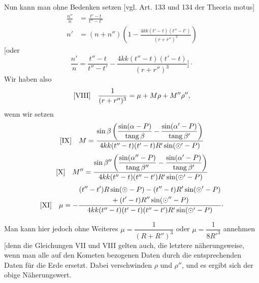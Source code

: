 Nun kann man ohne Bedenken setzen [vgl. Art. 133 und 134 der Theoria motus]
\[
\begin{aligned}
\frac{n''}{n}&=\frac{t'-t}{t''-t'}\\
n'&=(n+n'')\left(1-\frac{4kk(t'-t)(t''-t')}{(r+r'')^3}\right)
\end{aligned}
\]
[oder
\[
\frac{n'}{n}=\frac{t''-t}{t''-t'}-\frac{4kk(t''-t)(t'-t)}{(r+r'')^3}\Biggr]\mathpunct{\cdot}
\]
Wir haben also
\[
\begin{array}{l@{\quad}l}
[\mathrm{VIII}]&\displaystyle\frac{1}{(r+r'')^3}=\mu+M\rho+M''\rho'',
\end{array}
\]
wenn wir setzen
\[
\begin{array}{l@{\quad}l}
[\mathrm{IX}]&\displaystyle M=\frac{\sin\beta\left(\dfrac{\sin(\alpha-P)}{\operatorname{tang}\beta}-\dfrac{\sin(\alpha'-P)}{\operatorname{tang}\beta'}\right)}{4kk(t''-t)(t'-t)R'\sin(\odot'-P)}
\end{array}
\]
\[
\begin{array}{l@{\quad}l}
[\mathrm{X}]&\displaystyle M''=\frac{\sin\beta''\left(\dfrac{\sin(\alpha''-P)}{\operatorname{tang}\beta''}-\dfrac{\sin(\alpha'-P)}{\operatorname{tang}\beta'}\right)}{4kk(t''-t)(t''-t')R'\sin(\odot'-P)}
\end{array}
\]
\[
\begin{array}{l@{\quad}l}
[\mathrm{XI}]&\displaystyle\mu=-\frac{\begin{gathered}(t''-t')R\sin(\odot-P)-(t''-t)R'\sin(\odot'-P)\\{}+(t'-t)R''\sin(\odot''-P)\end{gathered}}{4kk(t''-t)(t'-t)(t''-t')R'\sin(\odot'-P)}\mathpunct{\cdot}
\end{array}
\]

Man kann hier jedoch ohne Weiteres \(\mu=\dfrac{1}{(R+R'')^3}\) oder \(\mu=\dfrac{1}{8R'^3}\) annehmen [denn die Gleichungen VII und VIII gelten auch, die letztere näherungsweise, wenn man alle auf den Kometen bezogenen Daten durch die entsprechenden Daten für die Erde ersetzt. Dabei verschwinden \(\rho\) und \(\rho''\), und es ergibt sich der obige Näherungswert.

